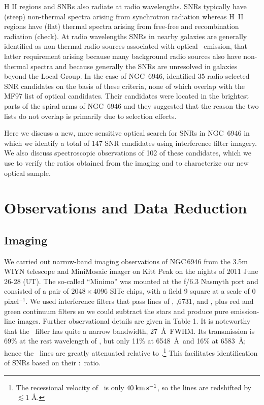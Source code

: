 H II regions and SNRs also radiate at radio wavelengths.  SNRs typically have (steep) non-thermal spectra arising from synchrotron radiation whereas H~II regions have (flat) thermal spectra arising from free-free and recombination radiation (check).  At radio wavelengths SNRs in nearby galaxies are generally identified as non-thermal radio sources associated with optical \ha\ emission, that latter requirement arising because many background radio sources also have non-thermal spectra and because generally the SNRs are unresolved in galaxies beyond the Local Group.  In the case of NGC~6946,  \cite{lacey01} identified 35 radio-selected SNR candidates on the basis of these criteria, none of which overlap with the MF97 list of optical candidates.  Their candidates were located in the brightest parts of the spiral arms of NGC~6946 and they suggested that the reason the two lists do not overlap is primarily due to selection effects.

Here we discuss a new, more sensitive optical search for SNRs in NGC~6946 in which we identify a total of 147 SNR candidates using interference filter imagery.  We also discuss spectroscopic observations of 102 of these candidates, which we use to verify the ratios obtained from the imaging and to characterize our new optical sample.

\section{Observations and Data Reduction \label{sec:observations}}
\subsection{Imaging}

We carried out narrow-band imaging observations of NGC\,6946 from the 3.5m WIYN telescope and MiniMosaic imager on Kitt Peak on the nights of 2011 June 26-28 (UT).  The so-called ``Minimo'' was mounted at the f/6.3 Nasmyth port and consisted of a pair of $2048\times4096$ SITe chips, with a field  9 square at a scale of 0 pixel$^{-1}$.  We used interference filters that pass lines of \ha, \sii {},6731, and \oiii {}, plus red and green continuum filters so we could subtract the stars and produce pure emission-line images.  Further observational details are given in Table 1.  It is noteworthy that the \ha\ filter has quite a narrow bandwidth, 27\ \AA\ FWHM. Its transmission is 69\% at the rest wavelength of \ha, but only 11\% at 6548\ \AA\ and 16\% at 6583\ \AA; hence the \nii\ lines are greatly attenuated relative to \ha.\footnote{The recessional velocity of \gal\ is only $40 \:\rm{km\,s^{-1}}$, so the lines are redshifted by $\lesssim 1$ \AA.}  This facilitates identification of SNRs based on their \sii:\ha\ ratio.

